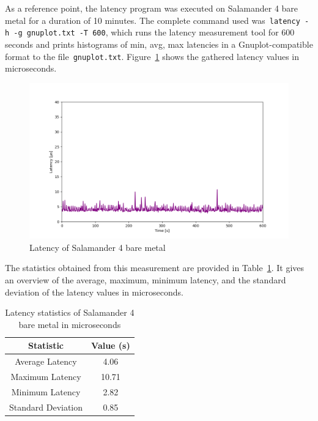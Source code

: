 \documentclass[MMR,Master,english]{twbook}
\begin{document}
\noindent As a reference point, the latency program was executed on Salamander 4 bare metal for a duration of 10 minutes. The complete command used was~\texttt{latency -h -g gnuplot.txt -T 600}, which runs the latency measurement tool for 600 seconds and prints histograms of min, avg, max latencies in a Gnuplot-compatible format to the file~\texttt{gnuplot.txt}. Figure~\ref{fig:max_latency_hardware} shows the gathered latency values in microseconds.

\begin{figure}[H]
	\centering
	\includegraphics[width=1.0\columnwidth]{img/max_latency_hardware.png}
	\caption[Latency of Salamander 4 bare metal]{Latency of Salamander 4 bare metal}
	\label{fig:max_latency_hardware}
\end{figure}

\noindent The statistics obtained from this measurement are provided in Table~\ref{tab:latency_statistics_bare_metal}. It gives an overview of the average, maximum, minimum latency, and the standard deviation of the latency values in microseconds.


\begin{table}[H]
	\centering
	\caption{Latency statistics of Salamander 4 bare metal in microseconds}
	\label{tab:latency_statistics_bare_metal}
	\setlength{\tabcolsep}{0.5em} %
	{\renewcommand{\arraystretch}{1.2}%
		\begin{tabular}{|c|c|}\hline
			\textbf{Statistic} & \textbf{Value (\textmu s)} \\\hline
			Average Latency    & 4.06                       \\\hline
			Maximum Latency    & 10.71                      \\\hline
			Minimum Latency    & 2.82                       \\\hline
			Standard Deviation & 0.85                       \\\hline
		\end{tabular}}
\end{table}
\end{document}
